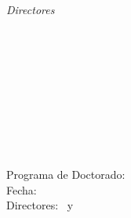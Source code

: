 \begin{titlepage}
	\textit{Directores} \\
		{\large \thesisFirstSupervisor} \\
	  	{\small \thesisFirstReviewerDepartment} \\
		{\small \thesisFirstReviewerUniversity} \\[5mm]
	    {\large \thesisSecondSupervisor} \\
	  	{\small \thesisSecondReviewerDepartment} \\
		{\small \thesisSecondReviewerUniversity} \\[5mm]
	\thesisDate \\

\end{titlepage}


\hfill
\vfill
{
	\small
	\textcolor{ctcolortitle}{\textit{\thesisTitle}} \\
	\textbf{\thesisName} \\
	Programa de Doctorado: \thesisSubject \\
	Fecha: \thesisDate \\
	Directores: \thesisFirstSupervisor\ y \thesisSecondSupervisor \\[1.5em]
}

